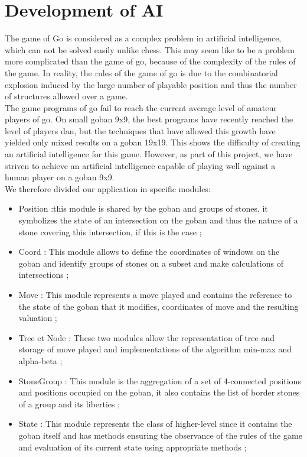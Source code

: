 \documentclass[a4paper,10pt,twoside]{report}
\begin{document}
	\section{Development of AI} 
	\vspace{4mm}

	The game of Go is considered as a complex problem in artificial intelligence, which can not be solved easily unlike chess. This may seem like to be a problem more complicated than the game of go, because of the complexity of the rules of the game. In reality, the rules of the game of go is due to the combinatorial explosion induced by the large number of playable position and thus the number of structures allowed over a game.\\

The game programs of go fail to reach the current average level of amateur players of go. On small goban 9x9, the best programs have recently reached the level of players dan, but the techniques that have allowed this growth have yielded only mixed results on a goban 19x19. This shows the difficulty of creating an artificial intelligence for this game. However, as part of this project, we have striven to achieve an artificial intelligence capable of playing well against a human player on a goban 9x9.\\

	We therefore divided our application in specific modules:
	\vspace{3mm}

	\begin{itemize}
		\item{Position :this module is shared by the goban and groups of stones, it symbolizes the state of an intersection on the goban and thus the nature of a stone covering this intersection, if this is the case ;}
		\vspace{1mm}
		\item{Coord : This module allows to define the coordinates of windows on the goban and identify groups of stones on a subset and make calculations of intersections ;}
		\vspace{1mm}
		\item{Move : This module represents a move played and contains the reference to the state of the goban that it modifies, coordinates of move and the resulting valuation ;}
		\vspace{1mm}
		\item{Tree et Node : These two modules allow the representation of tree and storage of move played and implementations of the  algorithm min-max and alpha-beta ;}
		\vspace{1mm}
		\item{StoneGroup : This module is the aggregation of a set of 4-connected positions and positions occupied on the goban, it also contains the list of border stones of a group and its liberties ;}
		\vspace{1mm}
		\item{State : This module represents the class of higher-level since it contains the goban itself and has methods ensuring the observance of the rules of the game and evaluation of its current state using appropriate methods ;}
	\end{itemize}
\end{document}
